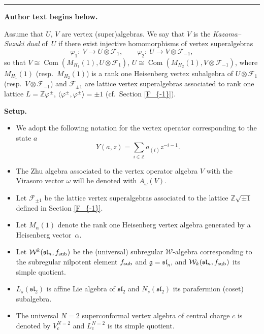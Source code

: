 \documentclass[11pt]{article}
\numberwithin{equation}{section}
\newcommand{\Z}{\mathbb Z}
\newcommand{\F}{\mathcal F}
\begin{document}
\medskip\hrule\medskip\noindent\textbf{Author text begins below.}\par
\setcounter{section}{1}\setcounter{equation}{0}
Assume that $U$, $V$ are vertex (super)algebras. We say that $V$ is the \emph{Kazama--Suzuki dual} of~$U$ if there exist injective homomorphisms of vertex superalgebras
\begin{equation} \label{KSdef}
	\varphi_1 \colon\ V \rightarrow U \otimes \F_1, \qquad \varphi_2 \colon\ U \rightarrow V \otimes \F_{-1},
\end{equation}
so that
$V \cong \operatorname{Com} ( M_{H_1} (1) , U \otimes \F_1)$, $ U \cong \operatorname{Com} ( M_{H_2} (1) , V \otimes \F_{-1})$,
where $M_{H_1} (1) $ (resp.\ $ M_{H_2} (1)$) is a rank one Heisenberg vertex subalgebra of
$U\otimes \F_1$ (resp.\ $V\otimes \F_{-1}$) and $\F_{\pm 1}$ are lattice vertex superalgebras associated to rank one lattice $L= {\Z}\varphi^{\pm} $, $\big\langle \varphi^{\pm}, \varphi^{\pm} \big\rangle = \pm 1$ (cf.\ Section \ref{F_{-1}}).

\setcounter{section}{1}
{\bf Setup.}
\begin{itemize}\itemsep=0pt
	\item We adopt the following notation for the vertex operator corresponding to the state $a$
\[
Y (a, z) = \sum _{i \in \mathbb{Z}} a_{(i)}z^{-i-1}.
\]
\item The Zhu algebra associated to the vertex operator algebra $V$ with the Virasoro vector $\omega$ will be denoted with $A_{\omega}(V)$.
\item Let $\F_{\pm 1}$ be the lattice vertex {super}algebras associated to the lattice ${\mathbb Z}\sqrt{\pm 1}$ defined in Section \ref{F_{-1}}.
\item Let $M_{\alpha}(1)$ denote the rank one Heisenberg vertex algebra generated by a Heisenberg vector~$\alpha$.
\item Let $\mathcal{W}^k(\mathfrak{sl}_n, f_{\rm sub})$ be the (universal) subregular $\mathcal{W}$-algebra corresponding to the subregular nilpotent element $f_{\rm sub}$ and $\mathfrak g = \mathfrak{sl}_n$, and $\mathcal{W}_k(\mathfrak{sl}_n, f_{\rm sub})$ its simple quotient.
\item $L_s(\mathfrak{sl}_2)$ is affine Lie algebra of $\mathfrak{sl}_2$ and $N_s(\mathfrak{sl}_2)$ its parafermion (coset) subalgebra.
\item The universal $N=2$ superconformal vertex algebra of central charge $c$ is denoted by $V^{N=2}_c$ and $L^{N=2}_{c}$ is its simple quotient.
\end{itemize}
\end{document}

